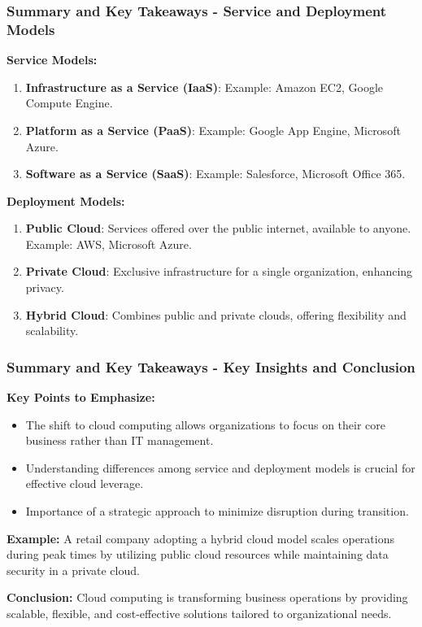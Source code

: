 \documentclass[aspectratio=169]{beamer}
\begin{document}
\begin{frame}[fragile]
    \frametitle{Summary and Key Takeaways - Service and Deployment Models}
    \textbf{Service Models:}
    \begin{enumerate}
        \item \textbf{Infrastructure as a Service (IaaS)}: Example: Amazon EC2, Google Compute Engine.
        \item \textbf{Platform as a Service (PaaS)}: Example: Google App Engine, Microsoft Azure.
        \item \textbf{Software as a Service (SaaS)}: Example: Salesforce, Microsoft Office 365.
    \end{enumerate}

    \textbf{Deployment Models:}
    \begin{enumerate}
        \item \textbf{Public Cloud}: Services offered over the public internet, available to anyone. Example: AWS, Microsoft Azure.
        \item \textbf{Private Cloud}: Exclusive infrastructure for a single organization, enhancing privacy.
        \item \textbf{Hybrid Cloud}: Combines public and private clouds, offering flexibility and scalability.
    \end{enumerate}
\end{frame}

\begin{frame}[fragile]
    \frametitle{Summary and Key Takeaways - Key Insights and Conclusion}
    \textbf{Key Points to Emphasize:}
    \begin{itemize}
        \item The shift to cloud computing allows organizations to focus on their core business rather than IT management.
        \item Understanding differences among service and deployment models is crucial for effective cloud leverage.
        \item Importance of a strategic approach to minimize disruption during transition.
    \end{itemize}

    \textbf{Example:}
    A retail company adopting a hybrid cloud model scales operations during peak times by utilizing public cloud resources while maintaining data security in a private cloud.

    \textbf{Conclusion:}
    Cloud computing is transforming business operations by providing scalable, flexible, and cost-effective solutions tailored to organizational needs.
\end{frame}
\end{document}
